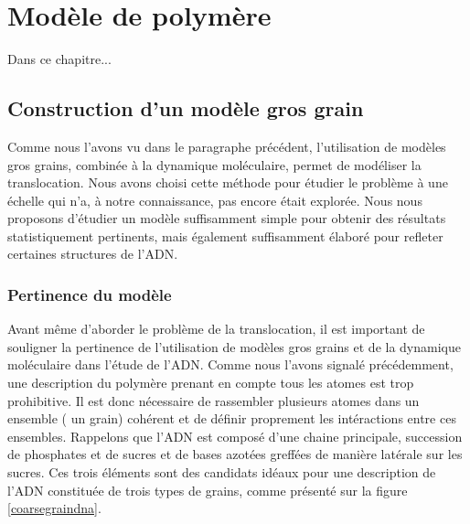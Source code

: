 
\chapter{Modèle de polymère}
\label{polymerevalidation}


Dans ce chapitre...

\minitoc

\newpage







\section{Construction d'un modèle gros grain}

Comme nous l'avons vu dans le paragraphe précédent, l'utilisation de modèles gros grains, combinée à la dynamique moléculaire, permet de modéliser la translocation. Nous avons choisi cette méthode pour étudier le problème à une échelle qui n'a, à notre connaissance, pas encore était explorée. Nous nous proposons d'étudier un modèle suffisamment simple pour obtenir des résultats statistiquement pertinents, mais également suffisamment élaboré pour refleter certaines structures de l'ADN.

\subsection{Pertinence du modèle}
Avant même d'aborder le problème de la translocation, il est important de souligner la pertinence de l'utilisation de modèles gros grains et de la dynamique moléculaire dans l'étude de l'ADN. Comme nous l'avons signalé précédemment, une description du polymère prenant en compte tous les atomes est trop prohibitive. Il est donc nécessaire de rassembler plusieurs atomes dans un ensemble ( un grain) cohérent et de définir proprement les intéractions entre ces ensembles. Rappelons que l'ADN est composé d'une chaine principale, succession de phosphates et de sucres et de bases azotées greffées de manière latérale sur les sucres. Ces trois éléments sont des candidats idéaux pour une description de l'ADN constituée de trois types de grains, comme présenté sur la figure \ref{coarsegraindna}.

